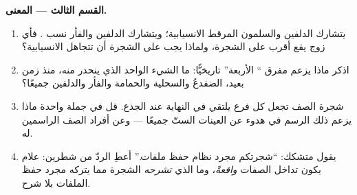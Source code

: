 \begin{problem}
\medskip\noindent\textbf{القسم الثالث --- المعنى.}
\begin{enumerate}[resume]
  \item يتشارك الدلفين والسلمون المرقط الانسيابية؛ ويتشارك
        الدلفين والفأر نسب  . فأي زوج يقع أقرب على
        الشجرة، ولماذا يجب على الشجرة أن تتجاهل الانسيابية؟
  \item اذكر ماذا يزعم مفرق `` الأربعة'' تاريخيًّا: ما
        الشيء الواحد الذي ينحدر منه، منذ زمن بعيد، الضفدعُ
        والسحلية والحمامة والفأر والدلفين جميعًا؟
  \item شجرة الصف تجعل كل فرع يلتقي في النهاية عند الجذع. قل في
        جملة واحدة ماذا يزعم ذلك الرسم في هدوء عن العينات الستّ
        جميعًا --- وعن أفراد الصف الراسمين له.
  \item يقول متشكك: ``شجرتكم مجرد نظام حفظ ملفات.'' أعطِ الردّ
        من شطرين: علام يكون تداخل الصفات \emph{واقعةً}، وما الذي
        \emph{تشرحه} الشجرة مما يتركه مجرد حفظ الملفات بلا شرح.
\end{enumerate}
\end{problem}
